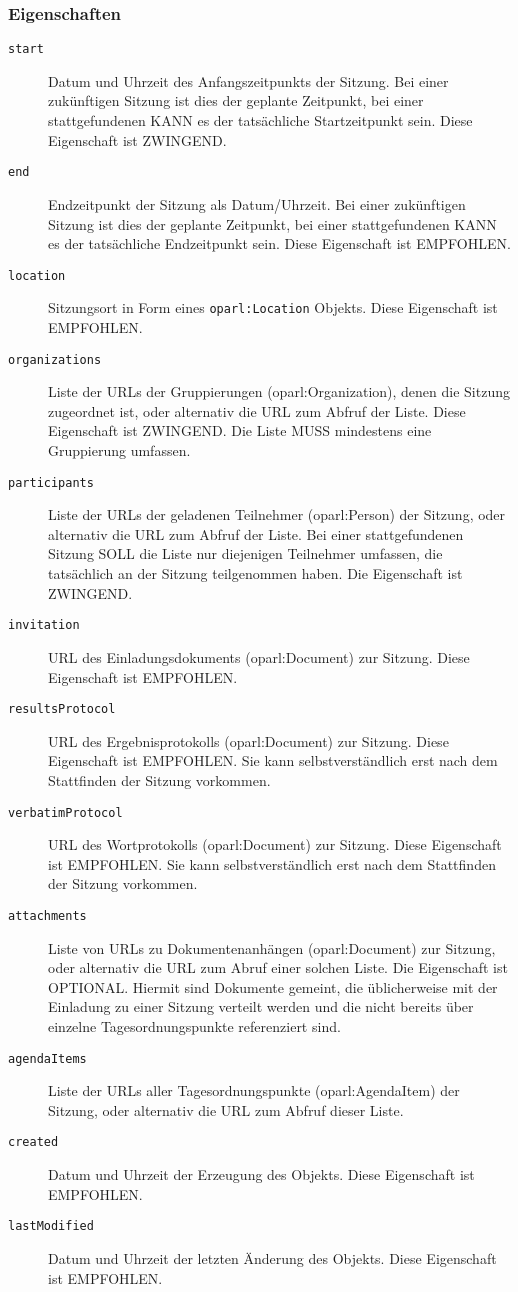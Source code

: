 \documentclass[,a4paper]{article}
\begin{document}
\subsubsection{Eigenschaften}\label{eigenschaften-4}

\begin{description}
\item[\texttt{start}]
Datum und Uhrzeit des Anfangszeitpunkts der Sitzung. Bei einer
zukünftigen Sitzung ist dies der geplante Zeitpunkt, bei einer
stattgefundenen KANN es der tatsächliche Startzeitpunkt sein. Diese
Eigenschaft ist ZWINGEND.
\item[\texttt{end}]
Endzeitpunkt der Sitzung als Datum/Uhrzeit. Bei einer zukünftigen
Sitzung ist dies der geplante Zeitpunkt, bei einer stattgefundenen KANN
es der tatsächliche Endzeitpunkt sein. Diese Eigenschaft ist EMPFOHLEN.
\item[\texttt{location}]
Sitzungsort in Form eines \texttt{oparl:Location} Objekts. Diese
Eigenschaft ist EMPFOHLEN.
\item[\texttt{organizations}]
Liste der URLs der Gruppierungen (oparl:Organization), denen die Sitzung
zugeordnet ist, oder alternativ die URL zum Abfruf der Liste. Diese
Eigenschaft ist ZWINGEND. Die Liste MUSS mindestens eine Gruppierung
umfassen.
\item[\texttt{participants}]
Liste der URLs der geladenen Teilnehmer (oparl:Person) der Sitzung, oder
alternativ die URL zum Abfruf der Liste. Bei einer stattgefundenen
Sitzung SOLL die Liste nur diejenigen Teilnehmer umfassen, die
tatsächlich an der Sitzung teilgenommen haben. Die Eigenschaft ist
ZWINGEND.
\item[\texttt{invitation}]
URL des Einladungsdokuments (oparl:Document) zur Sitzung. Diese
Eigenschaft ist EMPFOHLEN.
\item[\texttt{resultsProtocol}]
URL des Ergebnisprotokolls (oparl:Document) zur Sitzung. Diese
Eigenschaft ist EMPFOHLEN. Sie kann selbstverständlich erst nach dem
Stattfinden der Sitzung vorkommen.
\item[\texttt{verbatimProtocol}]
URL des Wortprotokolls (oparl:Document) zur Sitzung. Diese Eigenschaft
ist EMPFOHLEN. Sie kann selbstverständlich erst nach dem Stattfinden der
Sitzung vorkommen.
\item[\texttt{attachments}]
Liste von URLs zu Dokumentenanhängen (oparl:Document) zur Sitzung, oder
alternativ die URL zum Abruf einer solchen Liste. Die Eigenschaft ist
OPTIONAL. Hiermit sind Dokumente gemeint, die üblicherweise mit der
Einladung zu einer Sitzung verteilt werden und die nicht bereits über
einzelne Tagesordnungspunkte referenziert sind.
\item[\texttt{agendaItems}]
Liste der URLs aller Tagesordnungspunkte (oparl:AgendaItem) der Sitzung,
oder alternativ die URL zum Abfruf dieser Liste.
\item[\texttt{created}]
Datum und Uhrzeit der Erzeugung des Objekts. Diese Eigenschaft ist
EMPFOHLEN.
\item[\texttt{lastModified}]
Datum und Uhrzeit der letzten Änderung des Objekts. Diese Eigenschaft
ist EMPFOHLEN.
\end{description}
\end{document}
